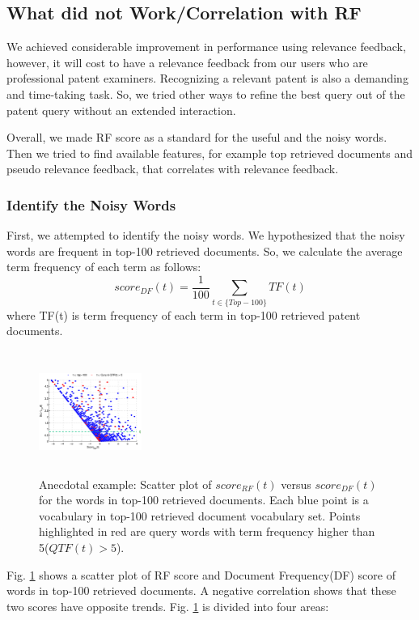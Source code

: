 \documentclass{sig-alternate}
\begin{document}
\subsection{What did not Work/Correlation with RF}
We achieved considerable improvement in performance using relevance feedback, however, it will cost to have a relevance feedback from our users who are professional patent examiners. Recognizing a relevant patent is also a demanding and time-taking task. So, we tried other ways to refine the best query out of the patent query without an extended interaction. 

Overall, we made RF score as a standard for the useful and the noisy words. Then we tried to find available features, for example top retrieved documents and pseudo relevance feedback, that correlates with relevance feedback. 
\subsubsection{Identify the Noisy Words}
First, we attempted to identify the noisy words. We hypothesized that the noisy words are frequent in top-100 retrieved documents. So, we calculate the average term frequency of each term as follows:
\begin{equation}
score_{DF}(t)= \frac{1}{100}\sum_{t\in \lbrace Top-100\rbrace} TF(t)  
 \label{eq:dfscore}
\end{equation}
where TF(t) is term frequency of each term in top-100 retrieved patent documents. 
\begin{figure}[htpb]
   \centering
   \includegraphics[width=0.30\textwidth,height=40mm]{figs/df-rf-tauline.eps}
   \caption{Anecdotal example: Scatter plot of $ score_{RF}(t) $ versus $ score_{DF}(t) $ for the words in top-100 retrieved documents. Each blue point is a vocabulary in top-100 retrieved document vocabulary set. Points highlighted in red are query words with term frequency higher than 5($ QTF(t)>5 $).}   
   \label{fig:dfrf} 
\end{figure}
Fig. \ref{fig:dfrf} shows a scatter plot of RF score and Document Frequency(DF) score of words in top-100 retrieved documents. A negative correlation shows that these two scores have opposite trends. Fig. \ref{fig:dfrf} is divided into four areas: 
\end{document}
